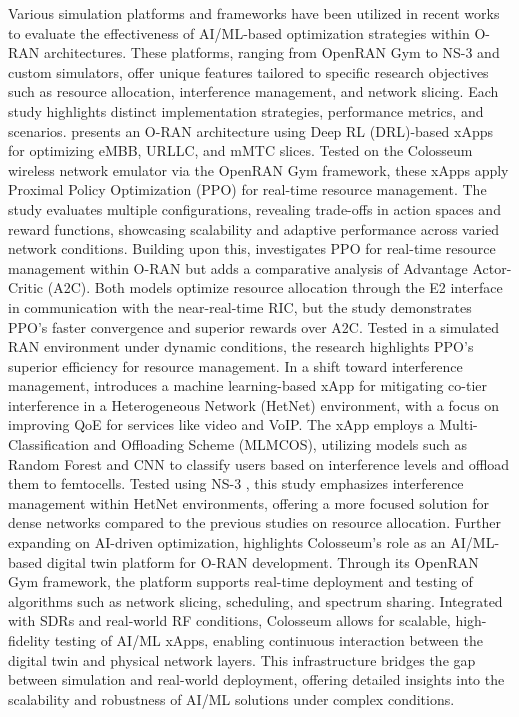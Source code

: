 Various simulation platforms and frameworks have been utilized in recent works to evaluate the effectiveness of AI/ML-based optimization strategies within O-RAN architectures. These platforms, ranging from OpenRAN Gym to NS-3 and custom simulators, offer unique features tailored to specific research objectives such as resource allocation, interference management, and network slicing. Each study highlights distinct implementation strategies, performance metrics, and scenarios.
\cite{tsampazi2023} presents an O-RAN architecture using Deep RL (DRL)-based xApps for optimizing eMBB, URLLC, and mMTC slices. Tested on the Colosseum wireless network emulator via the OpenRAN Gym framework, these xApps apply Proximal Policy Optimization (PPO) for real-time resource management. The study evaluates multiple configurations, revealing trade-offs in action spaces and reward functions, showcasing scalability and adaptive performance across varied network conditions.
Building upon this, \cite{marojevic2022actor} investigates PPO for real-time resource management within O-RAN but adds a comparative analysis of Advantage Actor-Critic (A2C). Both models optimize resource allocation through the E2 interface in communication with the near-real-time RIC, but the study demonstrates PPO's faster convergence and superior rewards over A2C. Tested in a simulated RAN environment under dynamic conditions, the research highlights PPO's superior efficiency for resource management.
In a shift toward interference management, \cite{Anand2023xApp} introduces a machine learning-based xApp for mitigating co-tier interference in a Heterogeneous Network (HetNet) environment, with a focus on improving QoE for services like video and VoIP. The xApp employs a Multi-Classification and Offloading Scheme (MLMCOS), utilizing models such as Random Forest and CNN to classify users based on interference levels and offload them to femtocells. Tested using NS-3 \cite{ns3}, this study emphasizes interference management within HetNet environments, offering a more focused solution for dense networks compared to the previous studies on resource allocation.
Further expanding on AI-driven optimization, \cite{Colosseum2023} highlights Colosseum's role as an AI/ML-based digital twin platform for O-RAN development. Through its OpenRAN Gym framework, the platform supports real-time deployment and testing of algorithms such as network slicing, scheduling, and spectrum sharing. Integrated with SDRs and real-world RF conditions, Colosseum allows for scalable, high-fidelity testing of AI/ML xApps, enabling continuous interaction between the digital twin and physical network layers. This infrastructure bridges the gap between simulation and real-world deployment, offering detailed insights into the scalability and robustness of AI/ML solutions under complex conditions.

